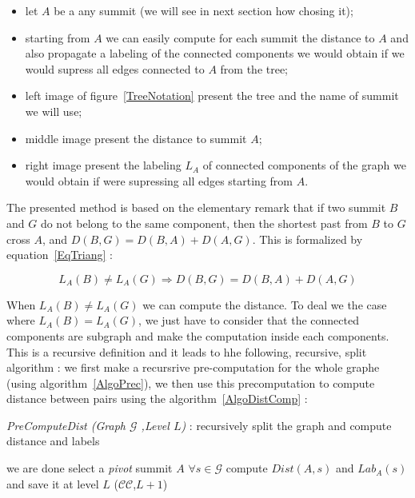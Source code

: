 \documentclass[a4paper]{article}
\begin{document}
\begin{itemize}
   \item  let $A$ be a any summit (we will see in next section how chosing it);

   \item  starting from $A$ we can easily compute for each summit the distance 
          to $A$ and also propagate a labeling of the connected components 
          we would obtain if we would supress all edges connected to $A$ from the tree;

   \item  left image of figure~\ref{TreeNotation} present the tree and the name of summit we will use;

   \item  middle image present the distance  to summit $A$;

   \item  right image present the labeling $L_A$  of connected components of the graph we would obtain
          if were supressing all edges starting from $A$.
 
\end{itemize}

The presented  method is based on the elementary remark that if two summit $B$ and $G$ do not belong
to the same component, then the shortest past from $B$ to $G$ cross $A$, and $D(B,G) = D(B,A) + D(A,G)$.
This is formalized by equation~\ref{EqTriang} :

\begin{equation}
   L_A(B) \neq L_A(G) \Rightarrow  D(B,G) = D(B,A) + D(A,G) \label{EqTriang}
\end{equation}


When $L_A(B) \neq L_A(G)$ we can compute the distance. To deal we the case where 
$L_A(B) = L_A(G)$, we just have to consider that the connected components are subgraph
and make the computation inside each components. This is a recursive definition
and it leads to hhe following, recursive, split algorithm  : we first
make a recursrive pre-computation for the whole graphe (using algorithm~\ref{AlgoPrec}),
we then use this precomputation  to compute distance between pairs using the 
algorithm~\ref{AlgoDistComp} :

\begin{algorithm}
\caption{{\it PreComputeDist (Graph $\mathcal{G}$ ,Level  $L$)} : recursively split the graph and compute distance and labels } 
\begin{algorithmic}
       \STATE we are done
    \ELSE
        \STATE select a \emph{pivot} summit $A$ 
        \STATE $\forall s\in \mathcal{G}$ compute $Dist(A,s)$ and $Lab_A(s) $ and save it at level $L$
               ($\mathcal{CC}$,$L+1$)
        \ENDFOR
    \ENDIF
\end{algorithmic}
\label{AlgoPrec}
\end{algorithm}
\end{document}
